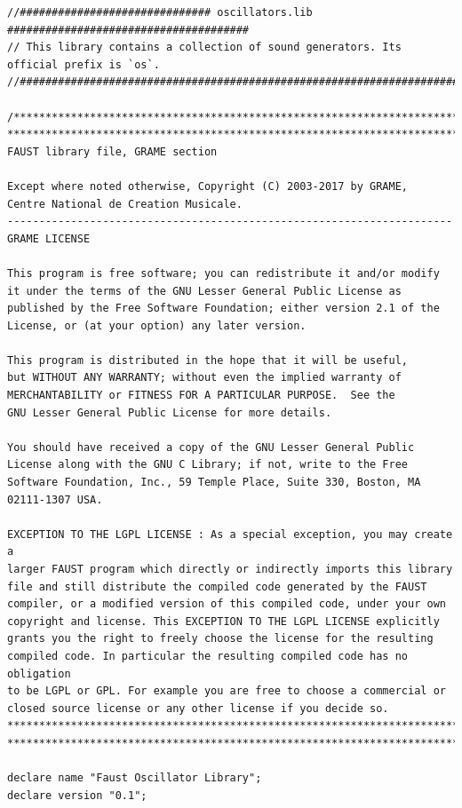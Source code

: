 \documentclass{article}
\begin{document}
\bigskip\bigskip
\begin{lstlisting}[caption=\texttt{oscillators.lib}]
//############################## oscillators.lib ######################################
// This library contains a collection of sound generators. Its official prefix is `os`.
//########################################################################################

/************************************************************************
************************************************************************
FAUST library file, GRAME section

Except where noted otherwise, Copyright (C) 2003-2017 by GRAME,
Centre National de Creation Musicale.
----------------------------------------------------------------------
GRAME LICENSE

This program is free software; you can redistribute it and/or modify
it under the terms of the GNU Lesser General Public License as
published by the Free Software Foundation; either version 2.1 of the
License, or (at your option) any later version.

This program is distributed in the hope that it will be useful,
but WITHOUT ANY WARRANTY; without even the implied warranty of
MERCHANTABILITY or FITNESS FOR A PARTICULAR PURPOSE.  See the
GNU Lesser General Public License for more details.

You should have received a copy of the GNU Lesser General Public
License along with the GNU C Library; if not, write to the Free
Software Foundation, Inc., 59 Temple Place, Suite 330, Boston, MA
02111-1307 USA.

EXCEPTION TO THE LGPL LICENSE : As a special exception, you may create a
larger FAUST program which directly or indirectly imports this library
file and still distribute the compiled code generated by the FAUST
compiler, or a modified version of this compiled code, under your own
copyright and license. This EXCEPTION TO THE LGPL LICENSE explicitly
grants you the right to freely choose the license for the resulting
compiled code. In particular the resulting compiled code has no obligation
to be LGPL or GPL. For example you are free to choose a commercial or
closed source license or any other license if you decide so.
************************************************************************
************************************************************************/

declare name "Faust Oscillator Library";
declare version "0.1";


\end{lstlisting}
\end{document}
